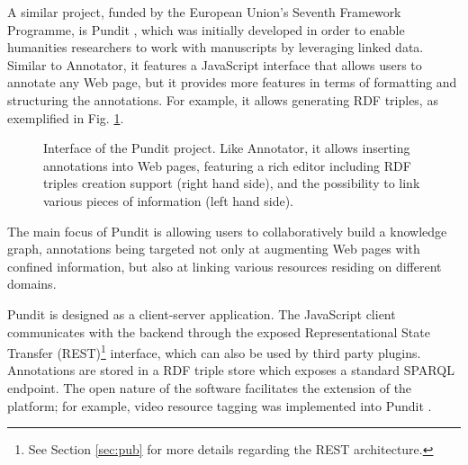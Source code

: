 A similar project, funded by the European Union's Seventh Framework Programme,
is Pundit \cite{ref:pundit}, which was initially developed in order to enable
humanities researchers to work with manuscripts by leveraging linked data.
Similar to Annotator, it features a JavaScript interface that allows users to
annotate any Web page, but it provides more features in terms of formatting and
structuring the annotations. For example, it allows generating RDF triples, as
exemplified in Fig. \ref{fig:pundit}.

\begin{figure}[!ht]
  \centering
  \caption[Interface of the Pundit project]
          {Interface of the Pundit project. Like Annotator, it allows
           inserting annotations into Web pages, featuring a rich editor
           including RDF triples creation support (right hand side), and
           the possibility to link various pieces of information (left hand
           side).}
  \label{fig:pundit}
\end{figure}

The main focus of Pundit is allowing users to collaboratively build a knowledge
graph, annotations being targeted not only at augmenting Web pages with
confined information, but also at linking various resources residing on
different domains.

Pundit is designed as a client-server application. The JavaScript client
communicates with the backend through the exposed Representational State
Transfer (REST)\footnote{See Section \ref{sec:pub} for more details regarding
the REST architecture.} interface, which can also be used by third party
plugins.  Annotations are stored in a RDF triple store which exposes a standard
SPARQL \cite{ref:sparql} endpoint. The open nature of the software facilitates
the extension of the platform; for example, video resource tagging was
implemented into Pundit \cite{ref:punditvideo}.

